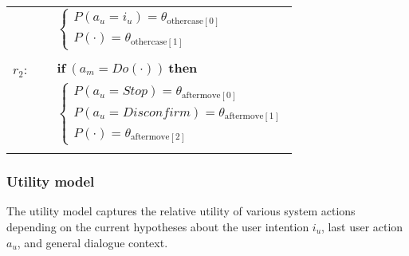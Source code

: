 \begin{footnotesize}
\begin{longtable}{p{2cm}l}
& \;\;\;\;\; $ \begin{cases}P(\mathit{a_u}\!=\!\mathit{{i_u}})\!=\!\theta_{\mathrm{othercase[0]}} \\
P(\cdot)\!=\!\theta_{\mathrm{othercase[1]}} \end{cases}$ \\ \\[-1mm]
$r_{2}$: \ \ & $ \textbf{if} \ (\mathit{a_m}\!=\!\mathit{Do(\cdot)}) \ \textbf{then} $ \\
 & \;\;\;\;\; $ \begin{cases}P(\mathit{a_u}\!=\!\mathit{Stop})\!=\!\theta_{\mathrm{aftermove[0]}} \\
P(\mathit{a_u}\!=\!\mathit{Disconfirm})\!=\!\theta_{\mathrm{aftermove[1]}} \\
P(\cdot)\!=\!\theta_{\mathrm{aftermove[2]}} \end{cases}$ \\ \\[-1mm]
\end{longtable}
\end{footnotesize}


\subsubsection*{Utility model}

The utility model captures the relative utility of various system actions depending on the current hypotheses about the user intention $i_u$, last user action $a_u$, and general dialogue context. 

